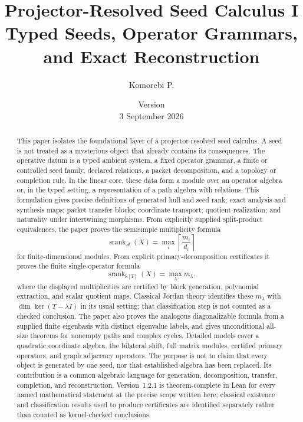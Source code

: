 \documentclass[11pt]{article}
\title{\textbf{Projector-Resolved Seed Calculus I}\\[0.45em]
\large Typed Seeds, Operator Grammars, and Exact Reconstruction}
\author{Komorebi P.}
\date{Version \paperversion\\3 September 2026}
\theoremstyle{definition}
\theoremstyle{remark}
\newcommand{\cA}{\mathcal A}
\newcommand{\srank}{\operatorname{srank}}
\newcommand{\bbk}{\mathbb{k}}
\newcommand{\paperversion}{1.2.1}
\begin{document}
\maketitle

\begin{abstract}
This paper isolates the foundational layer of a projector-resolved seed calculus. A seed is not treated as a mysterious object that already contains its consequences. The operative datum is a typed ambient system, a fixed operator grammar, a finite or controlled seed family, declared relations, a packet decomposition, and a topology or completion rule. In the linear core, these data form a module over an operator algebra or, in the typed setting, a representation of a path algebra with relations. This formulation gives precise definitions of generated hull and seed rank; exact analysis and synthesis maps; packet transfer blocks; coordinate transport; quotient realization; and naturality under intertwining morphisms. From explicitly supplied split-product equivalences, the paper proves the semisimple multiplicity formula
\[
\srank_{\cA}(X)=\max_i\left\lceil\frac{m_i}{d_i}\right\rceil
\]
for finite-dimensional modules. From explicit primary-decomposition certificates it proves the finite single-operator formula
\[
\srank_{\bbk[T]}(X)=\max_{\lambda}m_{\lambda},
\]
where the displayed multiplicities are certified by block generation, polynomial extraction, and scalar quotient maps. Classical Jordan theory identifies these $m_{\lambda}$ with $\dim\ker(T-\lambda I)$ in its usual setting; that classification step is not counted as a checked conclusion. The paper also proves the analogous diagonalizable formula from a supplied finite eigenbasis with distinct eigenvalue labels, and gives unconditional all-size theorems for nonempty paths and complex cycles. Detailed models cover a quadratic coordinate algebra, the bilateral shift, full matrix modules, certified primary operators, and graph adjacency operators. The purpose is not to claim that every object is generated by one seed, nor that established algebra has been replaced. Its contribution is a common algebraic language for generation, decomposition, transfer, completion, and reconstruction. Version~\paperversion{} is theorem-complete in Lean for every named mathematical statement at the precise scope written here; classical existence and classification results used to produce certificates are identified separately rather than counted as kernel-checked conclusions.
\end{abstract}
\end{document}
